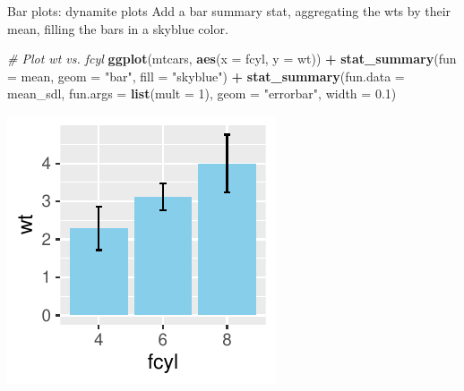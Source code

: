 \documentclass[
  ignorenonframetext,
]{beamer}
\newenvironment{Shaded}{\begin{snugshade}}{\end{snugshade}}
\newcommand{\AttributeTok}[1]{\textcolor[rgb]{0.13,0.29,0.53}{#1}}
\newcommand{\CommentTok}[1]{\textcolor[rgb]{0.56,0.35,0.01}{\textit{#1}}}
\newcommand{\DecValTok}[1]{\textcolor[rgb]{0.00,0.00,0.81}{#1}}
\newcommand{\FloatTok}[1]{\textcolor[rgb]{0.00,0.00,0.81}{#1}}
\newcommand{\FunctionTok}[1]{\textcolor[rgb]{0.13,0.29,0.53}{\textbf{#1}}}
\newcommand{\NormalTok}[1]{#1}
\newcommand{\SpecialCharTok}[1]{\textcolor[rgb]{0.81,0.36,0.00}{\textbf{#1}}}
\newcommand{\StringTok}[1]{\textcolor[rgb]{0.31,0.60,0.02}{#1}}
\begin{document}
\begin{frame}[fragile]{Bar plots: dynamite plots}
\label{bar-plots-dynamite-plots-3}
Add a bar summary stat, aggregating the wts by their mean, filling the
bars in a skyblue color.


\begin{Shaded}
\begin{Highlighting}[]
\CommentTok{\# Plot wt vs. fcyl}
\FunctionTok{ggplot}\NormalTok{(mtcars, }\FunctionTok{aes}\NormalTok{(}\AttributeTok{x =}\NormalTok{ fcyl, }\AttributeTok{y =}\NormalTok{ wt)) }\SpecialCharTok{+} \FunctionTok{stat\_summary}\NormalTok{(}\AttributeTok{fun =}\NormalTok{ mean,}
    \AttributeTok{geom =} \StringTok{"bar"}\NormalTok{, }\AttributeTok{fill =} \StringTok{"skyblue"}\NormalTok{) }\SpecialCharTok{+} \FunctionTok{stat\_summary}\NormalTok{(}\AttributeTok{fun.data =}\NormalTok{ mean\_sdl,}
    \AttributeTok{fun.args =} \FunctionTok{list}\NormalTok{(}\AttributeTok{mult =} \DecValTok{1}\NormalTok{), }\AttributeTok{geom =} \StringTok{"errorbar"}\NormalTok{, }\AttributeTok{width =} \FloatTok{0.1}\NormalTok{)}
\end{Highlighting}
\end{Shaded}

\begin{center}\includegraphics[width=0.5\linewidth]{Figs/unnamed-chunk-103-1} \end{center}
\end{frame}
\end{document}
